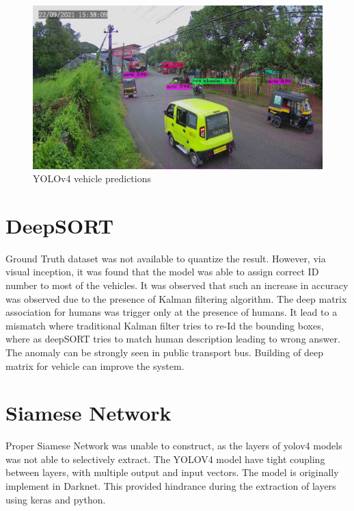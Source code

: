 \begin{figure}[ht!]
	\centering
	\includegraphics[width=0.8\linewidth]{Images/predictions}
	\caption{YOLOv4 vehicle predictions}
\end{figure}



\section{DeepSORT}
Ground Truth dataset was not available to quantize the result. However, via visual inception, it was found that the model was able to assign correct ID number to most of the vehicles. It was observed that such an increase in accuracy was observed due to the presence of Kalman filtering algorithm. The deep matrix association for humans was trigger only at the presence of humans. It lead to a mismatch where traditional Kalman filter tries to re-Id the bounding boxes, where as deepSORT tries to match human description leading to wrong answer. The anomaly can be strongly seen in public transport bus. Building of deep matrix for vehicle can improve the system.

\section{Siamese Network}
Proper Siamese Network was unable to construct, as the layers of yolov4 models was not able to selectively extract. The YOLOV4 model have tight coupling between layers, with multiple output and input vectors. The model is originally implement in Darknet.  This provided hindrance during the extraction of layers using keras and python.

